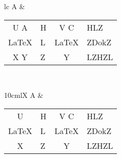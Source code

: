 \documentclass{article}
\begin{document}
  \bfseries

\begin{tabular}{lC}
    A &
    {%
    \begin{tabular}{|cTCT|}        \hline
    U \relax A      & H & V  C  & HLZ     \\
    \LaTeX & L & \LaTeX & ZD{{ok}}Z \\
    X \unskip Y     & Z & \hbox\bgroup Y\egroup      & LZHZL    \\ \hline
    \end{tabular}} \\
\end{tabular}

\begin{tabularx}{10cm}{lX}
    A &
    {%
    \begin{tabular}{|cTCT|}        \hline
    U      & H & V  C  & HLZ     \\
    \LaTeX & L & \LaTeX & ZD{{ok}}Z \\
    X      & Z & \hbox\bgroup Y\egroup      & LZHZL    \\ \hline
    \end{tabular}} \\
\end{tabularx}
\end{document}
